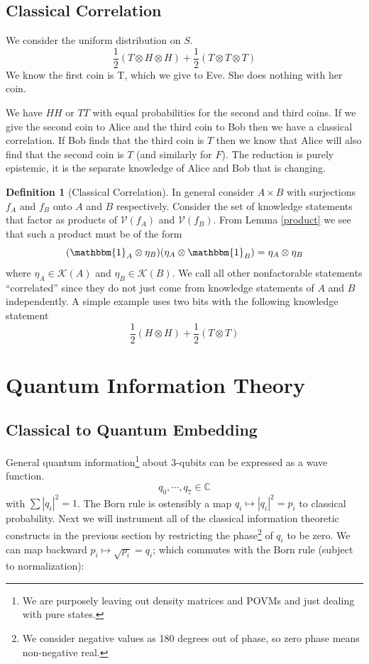 \documentclass[12pt,a4paper]{article}
\theoremstyle{myrule}
\theoremstyle{postulate}
\theoremstyle{definition}
\newtheorem{definition}{Definition}[section]
\begin{document}
\subsection{Classical Correlation}
We consider the uniform distribution on $S$.
\[
\frac{1}{2}(T \otimes H \otimes H) + \frac{1}{2}(T \otimes T \otimes T)
\]
We know the first coin is T, which we give to Eve.  She does nothing with her coin.

We have $HH$ or $TT$ with equal probabilities for the second and third coins.  If we give the second coin to Alice and the third coin to Bob then we have a classical correlation.  If Bob finds that the third coin is $T$ then we know that Alice will also find that the second coin is $T$ (and similarly for $F$).  The reduction is purely epistemic, it is the separate knowledge of Alice and Bob that is changing.

\begin{definition}[Classical Correlation]
\label{corrdef}
In general consider $A \times B$ with surjections $f_A$ and $f_B$ onto $A$ and $B$ respectively.  Consider the set of knowledge statements that factor as products of $\mathcal{V}(f_A)$ and $\mathcal{V}(f_B)$.  From Lemma \ref{product} we see that such a product must be of the form
\[
(\mathbbm{1}_A \otimes \eta_B) (\eta_A \otimes \mathbbm{1}_B) = \eta_A \otimes \eta_B
\]
where $\eta_A \in \mathcal{K}(A)$ and $\eta_B \in \mathcal{K}(B)$.  We call all other nonfactorable statements ``correlated'' since they do not just come from knowledge statements of $A$ and $B$ independently.  A simple example uses two bits with the following knowledge statement
\begin{equation}
\label{classiccorr}
  \frac{1}{2} (H \otimes H) + \frac{1}{2} (T \otimes T) 
\end{equation}

\end{definition}

\section{Quantum Information Theory}
\subsection{Classical to Quantum Embedding}
General quantum information\footnote{We are purposely leaving out density matrices and POVMs and just dealing with pure states.} about 3-qubits can be expressed as a wave function.
\[
   q_\mathit{0},\cdots,q_\mathit{7} \in \mathbb{C}
\]
with $\sum |q_i|^2 = 1$.  The Born rule is ostensibly a map $q_i \mapsto |q_i|^2 = p_i$ to classical probability.  Next we will instrument all of the classical information theoretic constructs in the previous section by restricting the phase\footnote{We consider negative values as 180 degrees out of phase, so zero phase means non-negative real.} of $q_i$ to be zero.  We can map backward $p_i \mapsto \sqrt{p_i} = q_i$; which commutes with the Born rule (subject to normalization):
\end{document}
